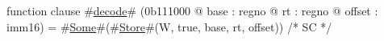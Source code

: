function clause #\hyperref[zdecode]{decode}# (0b111000 @ base : regno @ rt : regno @ offset : imm16) =
  #\hyperref[zSome]{Some}#(#\hyperref[zStore]{Store}#(W, true, base, rt, offset))  /* SC */
